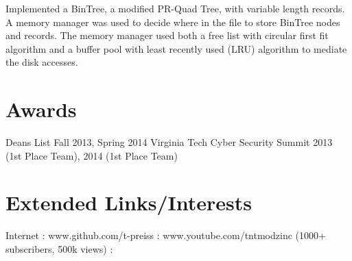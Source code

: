 \documentclass{tpreiss_cv}
\begin{document}
Implemented a BinTree, a modified PR-Quad Tree, with variable length records. A memory manager was used to decide where in the file to store BinTree nodes and records. The memory manager used both a free list with circular first fit algorithm and a buffer pool with least recently used (LRU) algorithm to mediate the disk accesses.

\section{Awards}
Deans List Fall 2013, Spring 2014                  
Virginia Tech Cyber Security Summit 2013 (1st Place Team), 2014 (1st Place Team)

\section{Extended Links/Interests}

Internet : www.github.com/t-preiss  :  www.youtube.com/tntmodzinc  (1000+ subscribers, 500k views) :
\end{document}
